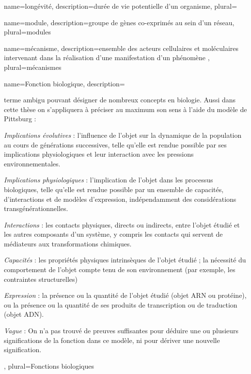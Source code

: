 
\printglossary[nonumberlist]
\glsaddall


{
	name={longévité},
	description={durée de vie potentielle d'un organisme}, 
	plural={}
}

{
	name={module},
	description={groupe de gènes co-exprimés au sein d'un réseau}, 
	plural={modules}
}

{
	name={m\'{e}canisme},
	description={ensemble des acteurs cellulaires et moléculaires intervenant dans la réalisation d'une manifestation d'un phénomène \cite{Bechtel2013}}, 
	plural={m\'{e}canismes}
}

{
	name={Fonction biologique},
	description={terme ambigu pouvant désigner de nombreux concepts en biologie. Aussi dans cette thèse on s'appliquera à préciser au maximum son sens à l'aide du modèle de Pittsburg \cite{Keeling2019Nov}:
	\begin{description}
	    \item \textit{Implications évolutives} : l'influence de l'objet sur la dynamique de la population au cours de générations successives, telle qu'elle est rendue possible par ses implications physiologiques et leur interaction avec les pressions environnementales.
	    \item \textit{Implications physiologiques} : l'implication de l'objet dans les processus biologiques, telle qu'elle est rendue possible par un ensemble de capacités, d'interactions et de modèles d'expression, indépendamment des considérations transgénérationnelles.
	    \item \textit{Interactions} : les contacts physiques, directs ou indirects, entre l'objet étudié et les autres composants d'un système, y compris les contacts qui servent de médiateurs aux transformations chimiques.
	    \item \textit{Capacités} : les propriétés physiques intrinsèques de l'objet étudié ; la nécessité du comportement de l'objet compte tenu de son environnement (par exemple, les contraintes structurelles)
	    \item \textit{Expression} : la présence ou la quantité de l'objet étudié (objet ARN ou protéine), ou la présence ou la quantité de ses produits de transcription ou de traduction (objet ADN).
	    \item \textit{Vague} : On n'a pas trouvé de preuves suffisantes pour déduire une ou plusieurs significations de la fonction dans ce modèle, ni pour dériver une nouvelle signification.
	\end{description}
	}, 
	plural={Fonctions biologiques}
}


